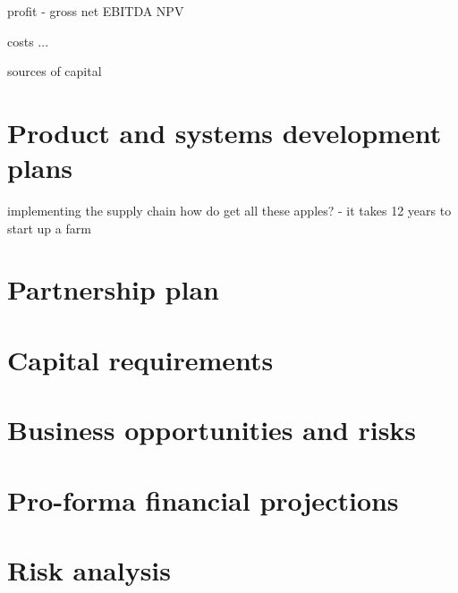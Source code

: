 \documentclass{article}
\begin{document}
profit
 - gross
   net
   EBITDA
   NPV

costs
 ...

sources of capital
\section{Product and systems development plans}
implementing the supply chain
how do get all these apples? - it takes 12 years to start up a farm
\section{Partnership plan}
\section{Capital requirements}
\section{Business opportunities and risks}
\section{Pro-forma financial projections}
\section{Risk analysis}
\end{document}
